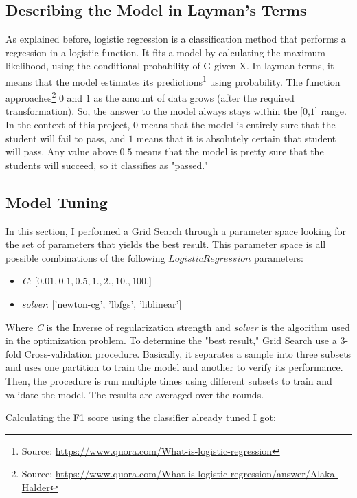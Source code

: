 \documentclass[a4paper]{article}
\begin{document}
\subsection{Describing the Model in Layman’s Terms}
As explained before, logistic regression is a classification method that performs a regression in a logistic function. It fits a model by calculating the maximum likelihood, using the conditional probability of G given X. In layman terms, it means that the model estimates its predictions\footnote{Source: \url{https://www.quora.com/What-is-logistic-regression}} using probability. The function approaches\footnote{Source: \url{https://www.quora.com/What-is-logistic-regression/answer/Alaka-Halder}} $0$ and $1$ as the amount of data grows (after the required transformation). So, the answer to the model always stays within the [$0$,$1$] range. In the context of this project, $0$ means that the model is entirely sure that the student will fail to pass, and $1$ means that it is absolutely certain that student will pass. Any value above $0.5$ means that the model is pretty sure that the students will succeed, so it classifies as "passed."

\subsection{Model Tuning}
In this section, I performed a Grid Search through a parameter space looking for the set of parameters that yields the best result. This parameter space is all possible combinations of the following $Logistic Regression$ parameters:
\begin{itemize}
\item \textit{C}: [$0.01, 0.1, 0.5, 1., 2., 10., 100.$]
\item \textit{solver}: ['newton-cg', 'lbfgs', 'liblinear'] 
\end{itemize}

Where \textit{C} is the Inverse of regularization strength and \textit{solver} is the algorithm used in the optimization problem. To determine the "best result," Grid Search use a 3-fold Cross-validation procedure. Basically, it separates a sample into three subsets and uses one partition to train the model and another to verify its performance. Then, the procedure is run multiple times using different subsets to train and validate the model. The results are averaged over the rounds.

Calculating the F1 score using the classifier already tuned I got:
\end{document}
